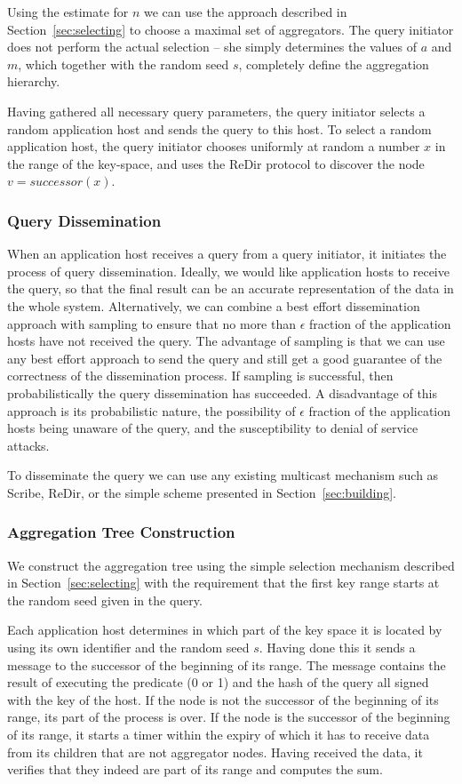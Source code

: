 \documentclass[11pt,twocolumn]{MyTightStyle}
\theoremstyle{plain}
\theoremstyle{definition}
\theoremstyle{remark}
\numberwithin{equation}{section}
\begin{document}
Using the estimate for $n$ we can use the approach described in
Section~\ref{sec:selecting} to choose a maximal set of
aggregators. The query initiator does not perform the actual selection
-- she simply determines the values of $a$ and $m$, which together
with the random seed $s$, completely define the aggregation hierarchy.

Having gathered all necessary query parameters, the query initiator
selects a random application host and sends the query to this host. To
select a random application host, the query initiator chooses
uniformly at random a number $x$ in the range of the key-space, and uses
the ReDir protocol to discover the node $v=successor(x)$.   

\subsubsection{Query Dissemination}
When an application host receives a query from a query
initiator, it initiates the process of query dissemination. Ideally,
we would like application hosts to receive the query, so that the
final result can be an accurate representation of the data in the
whole system. Alternatively, we can combine a best effort
dissemination approach with sampling to ensure that no more than
$\epsilon$ fraction of the application hosts have not received the
query. The 
advantage of sampling  is that we can use any best effort
approach to send the query and still get a good guarantee of the
correctness of the dissemination process. If sampling is successful, then
probabilistically the query dissemination has succeeded. A
disadvantage of this approach is its probabilistic nature, the
possibility of $\epsilon$ fraction of the application hosts being
unaware of the query, and the susceptibility to denial of service
attacks.

To disseminate the query we can use any existing multicast mechanism
such as Scribe, ReDir, or the simple scheme presented in
Section~\ref{sec:building}. 


\subsubsection{Aggregation Tree Construction}
We construct the aggregation tree using the simple selection mechanism
described in Section~\ref{sec:selecting} with the requirement that the
first key range starts at the random seed given in the query.

Each application host determines in which part of the key space it is
located by using its own identifier and the random seed $s$. Having
done this it sends a message to the successor of the beginning of its
range. The message contains the result of executing the predicate (0
or 1) and the hash of the query all signed with the key of the host. If
the node is not the successor of the beginning of its range, its part
of the process is over. If the node is the successor of the beginning
of its range, it starts a timer within the expiry of which it  has to
receive data from its children that are not aggregator nodes. Having
received the data, it verifies that they indeed are part of its range
and computes the sum. 
\end{document}
